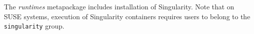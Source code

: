 \begin{center}
\begin{tcolorbox}[]
\small
The {\em runtimes} metapackage includes installation of
Singularity. Note that on SUSE systems, execution of Singularity containers
requires users to belong to the \texttt{singularity} group.
\end{tcolorbox}
\end{center}

